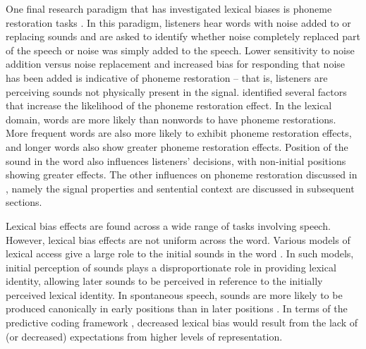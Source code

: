One final research paradigm that has investigated lexical biases is phoneme restoration tasks \citep{Samuel1981}.  
In this paradigm, listeners hear words with noise added to or replacing sounds and are asked to identify whether noise completely replaced part of the speech or noise was simply added to the speech.  
Lower sensitivity to noise addition versus noise replacement and increased bias for responding that noise has been added is indicative of phoneme restoration -- that is, listeners are perceiving sounds not physically present in the signal.  
\citet{Samuel1981} identified several factors that increase the likelihood of the phoneme restoration effect.
In the lexical domain, words are more likely than nonwords to have phoneme restorations.  
More frequent words are also more likely to exhibit phoneme restoration effects, and longer words also show greater phoneme restoration effects.  
Position of the sound in the word also influences listeners' decisions, with non-initial positions showing greater effects. 
The other influences on phoneme restoration discussed in \citet{Samuel1981}, namely the signal properties and sentential context are discussed in subsequent sections.

Lexical bias effects are found across a wide range of tasks involving speech.
However, lexical bias effects are not uniform across the word.
Various models of lexical access give a large role to the initial sounds in the word \citep{Marslen-Wilson1978, Gow1995}.
In such models, initial perception of sounds plays a disproportionate role in providing lexical identity, allowing later sounds to be perceived in reference to the initially perceived lexical identity.
In spontaneous speech, sounds are more likely to be produced canonically in early positions than in later positions \citep{Pitt2012}.
In terms of the predictive coding framework \citep{Clark2013}, decreased lexical bias would result from the lack of (or decreased) expectations from higher levels of representation.

